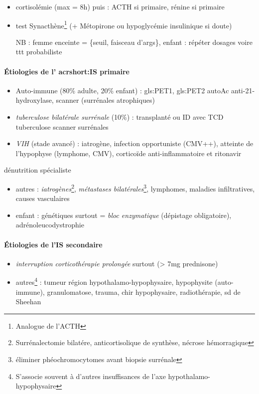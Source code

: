 \documentclass{book}
\begin{document}
\begin{itemize}
\item cortisolémie (max = 8h) puis : ACTH \inc{} si primaire, rénine \inc si primaire
\item test Synacthène\footnote{Analogue de l'ACTH} (+ Métopirone ou hypoglycémie insulinique si doute)

NB : femme enceinte = \{\inc seuil, faisceau d'args\}, enfant : répéter dosages
voire ttt probabiliste
\end{itemize}

\paragraph{Étiologies de l' acrshort:IS primaire}
\label{sec:org993a3a2}
\begin{itemize}
\item Auto-immune (80\% adulte, 20\% enfant) : gls:PET1, gls:PET2 \thus autoAc anti-21-hydroxylase, scanner (surrénales atrophiques)
\item \emph{tuberculose bilatérale surrénale} (10\%) : transplanté ou ID avec TCD tuberculose
\thus scanner surrénales
\item \emph{VIH} (stade avancé) : iatrogène, infection opportuniste (CMV++), atteinte de
l'hypophyse (lymphome, CMV), corticoïde anti-inflammatoire et ritonavir
\end{itemize}
\danger dénutrition \thus spécialiste
\begin{itemize}
\item autres : \emph{iatrogènes}\footnote{Surrénalectomie bilatére, anticortisolique de synthèse, nécrose hémorragique}, \emph{métastases bilatérales}\footnote{\danger éliminer phéochromocytomes avant biopsie surrénale}, lymphomes, maladies
infiltratives, causes vasculaires
\item enfant : génétiques surtout = \emph{bloc enzymatique} (dépistage obligatoire), adrénoleucodystrophie
\end{itemize}

\paragraph{Étiologies de l'IS secondaire}
\label{sec:org74d7fae}
\begin{itemize}
\item \emph{interruption corticothérapie prolongée} surtout (> 7mg prednisone)
\item autres\footnote{S'associe souvent à d'autres insuffisances de l'axe hypothalamo-hypophysaire} : tumeur région hypothalamo-hypophysaire, hypophysite (auto-immune),
granulomatose, trauma, chir hypophysaire, radiothérapie, sd de Sheehan
\end{itemize}
\end{document}
